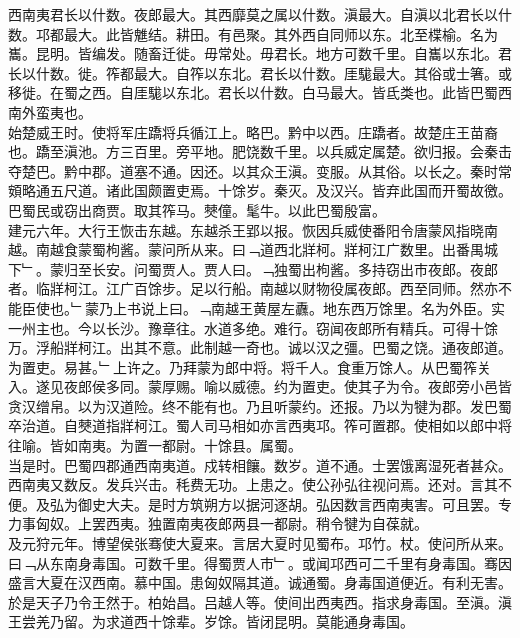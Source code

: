 \documentclass{zhvt-classic}
\begin{document}

\hspace*{2em}西南夷君长以什数。夜郎最大。其西靡莫之属以什数。滇最大。自滇以北君长以什数。邛都最大。此皆魋结。耕田。有邑聚。其外西自同师以东。北至楪榆。名为巂。昆明。皆编发。随畜迁徙。毋常处。毋君长。地方可数千里。自巂以东北。君长以什数。徙。筰都最大。自筰以东北。君长以什数。厓駹最大。其俗或士箸。或移徙。在蜀之西。自厓駹以东北。君长以什数。白马最大。皆氐类也。此皆巴蜀西南外蛮夷也。\\
\hspace*{2em}始楚威王时。使将军庄蹻将兵循江上。略巴。黔中以西。庄蹻者。故楚庄王苗裔也。蹻至滇池。方三百里。旁平地。肥饶数千里。以兵威定属楚。欲归报。会秦击夺楚巴。黔中郡。道塞不通。因还。以其众王滇。变服。从其俗。以长之。秦时常頞略通五尺道。诸此国颇置吏焉。十馀岁。秦灭。及汉兴。皆弃此国而开蜀故徼。巴蜀民或窃出商贾。取其筰马。僰僮。髦牛。以此巴蜀殷富。\\
\hspace*{2em}建元六年。大行王恢击东越。东越杀王郢以报。恢因兵威使番阳令唐蒙风指晓南越。南越食蒙蜀枸酱。蒙问所从来。曰﹁道西北牂柯。牂柯江广数里。出番禺城下﹂。蒙归至长安。问蜀贾人。贾人曰。﹁独蜀出枸酱。多持窃出市夜郎。夜郎者。临牂柯江。江广百馀步。足以行船。南越以财物役属夜郎。西至同师。然亦不能臣使也。﹂蒙乃上书说上曰。﹁南越王黄屋左纛。地东西万馀里。名为外臣。实一州主也。今以长沙。豫章往。水道多绝。难行。窃闻夜郎所有精兵。可得十馀万。浮船牂柯江。出其不意。此制越一奇也。诚以汉之彊。巴蜀之饶。通夜郎道。为置吏。易甚。﹂上许之。乃拜蒙为郎中将。将千人。食重万馀人。从巴蜀筰关入。遂见夜郎侯多同。蒙厚赐。喻以威德。约为置吏。使其子为令。夜郎旁小邑皆贪汉缯帛。以为汉道险。终不能有也。乃且听蒙约。还报。乃以为犍为郡。发巴蜀卒治道。自僰道指牂柯江。蜀人司马相如亦言西夷邛。筰可置郡。使相如以郎中将往喻。皆如南夷。为置一都尉。十馀县。属蜀。\\
\hspace*{2em}当是时。巴蜀四郡通西南夷道。戍转相饟。数岁。道不通。士罢饿离湿死者甚众。西南夷又数反。发兵兴击。秏费无功。上患之。使公孙弘往视问焉。还对。言其不便。及弘为御史大夫。是时方筑朔方以据河逐胡。弘因数言西南夷害。可且罢。专力事匈奴。上罢西夷。独置南夷夜郎两县一都尉。稍令犍为自葆就。\\
\hspace*{2em}及元狩元年。博望侯张骞使大夏来。言居大夏时见蜀布。邛竹。杖。使问所从来。曰﹁从东南身毒国。可数千里。得蜀贾人市﹂。或闻邛西可二千里有身毒国。骞因盛言大夏在汉西南。慕中国。患匈奴隔其道。诚通蜀。身毒国道便近。有利无害。於是天子乃令王然于。柏始昌。吕越人等。使间出西夷西。指求身毒国。至滇。滇王尝羌乃留。为求道西十馀辈。岁馀。皆闭昆明。莫能通身毒国。\\
\end{document}
